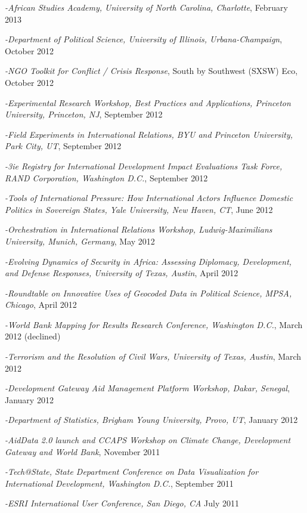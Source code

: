\documentclass[10pt]{article}
\begin{document}
\begin{etaremune}
\item\textit{-African Studies Academy, University of North Carolina, Charlotte}, February 2013
\item\textit{-Department of Political Science, University of Illinois, Urbana-Champaign}, October 2012
\item\textit{-NGO Toolkit for Conflict / Crisis Response}, South by Southwest (SXSW) Eco, October 2012
\item\textit{-Experimental Research Workshop, Best Practices and Applications, Princeton University, Princeton, NJ}, September 2012
\item\textit{-Field Experiments in International Relations, BYU and Princeton University, Park City, UT}, September 2012
\item\textit{-3ie Registry for International Development Impact Evaluations Task Force, RAND Corporation, Washington D.C.}, September 2012
\item\textit{-Tools of International Pressure: How International Actors Influence Domestic Politics in Sovereign States, Yale University, New Haven, CT}, June 2012
\item\textit{-Orchestration in International Relations Workshop, Ludwig-Maximilians University, Munich, Germany}, May 2012
\item\textit{-Evolving Dynamics of Security in Africa: Assessing Diplomacy, Development, and Defense Responses, University of Texas, Austin}, April 2012
\item\textit{-Roundtable on Innovative Uses of Geocoded Data in Political Science, MPSA, Chicago}, April 2012
\item\textit{-World Bank Mapping for Results Research Conference, Washington D.C.}, March 2012 (declined)
\item\textit{-Terrorism and the Resolution of Civil Wars, University of Texas, Austin}, March 2012
\item\textit{-Development Gateway Aid Management Platform Workshop, Dakar, Senegal}, January 2012
\item\textit{-Department of Statistics, Brigham Young University, Provo, UT}, January 2012
\item\textit{-AidData 2.0 launch and CCAPS Workshop on Climate Change, Development Gateway and World Bank}, November 2011
\item\textit{-Tech@State, State Department Conference on Data Visualization for International Development, Washington D.C.}, September 2011
\item\textit{-ESRI International User Conference, San Diego, CA} July 2011

\end{etaremune}
\end{document}

